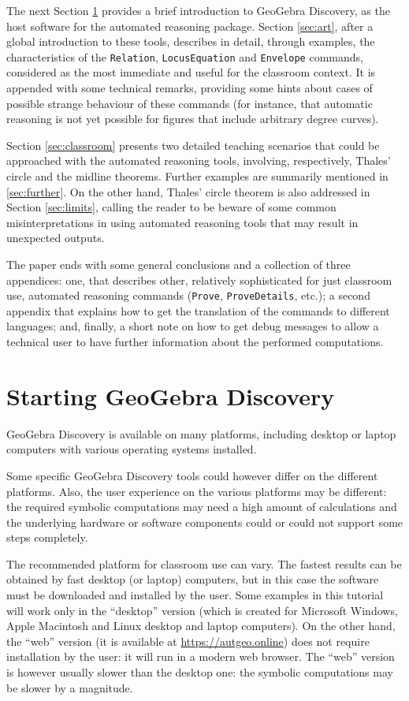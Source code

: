\documentclass{article}
\begin{document}
The next Section \ref{sec:starting} provides a brief introduction to
GeoGebra Discovery, as the host software for the automated reasoning
package. Section \ref{sec:art}, after a global introduction to these tools,
describes in detail, through examples, the characteristics of the
\texttt{Relation}, \texttt{LocusEquation} and \texttt{Envelope} commands,
considered as the most immediate and useful for the classroom
context. It is appended with some technical remarks,
providing some hints about cases of possible strange
behaviour of these commands (for instance, that automatic
reasoning is not yet possible for figures that include arbitrary
degree curves).

Section \ref{sec:classroom} presents two detailed teaching scenarios that
could be approached with the automated reasoning tools,
involving, respectively, Thales’ circle and the midline
theorems. Further examples are summarily mentioned in \ref{sec:further}.
On the other hand, Thales’ circle theorem is also addressed in
Section \ref{sec:limits}, calling the reader to be beware of some common
misinterpretations in using automated reasoning tools that
may result in unexpected outputs.

The paper ends with some general conclusions and a
collection of three appendices: one, that describes other,
relatively sophisticated for just classroom use, automated
reasoning commands (\texttt{Prove}, \texttt{ProveDetails}, etc.); a second
appendix that explains how to get the translation of the
commands to different languages; and, finally, a short note on
how to get debug messages to allow a technical user to have
further information about the performed computations.


\section{Starting GeoGebra Discovery}\label{sec:starting}

GeoGebra Discovery is available on many platforms, including desktop or laptop computers with various operating systems installed.

Some specific GeoGebra Discovery tools could however differ on the different platforms. Also, the user experience on the various platforms may be different: the required symbolic computations may need a high amount of calculations and the underlying hardware or software components could or could not support some steps completely.

The recommended platform for classroom use can vary. The fastest results can be obtained by fast desktop (or laptop) computers, but in this case the software must be downloaded and installed by the user. Some examples in this tutorial will work only in the ``desktop'' version (which is created for Microsoft Windows, Apple Macintosh and Linux desktop and laptop computers). On the other hand, the ``web'' version (it is available at \url{https://autgeo.online}) does not require installation by the user: it will run in a modern web browser. The ``web'' version is however usually slower than the desktop one: the symbolic computations may be slower by a magnitude.
\end{document}
